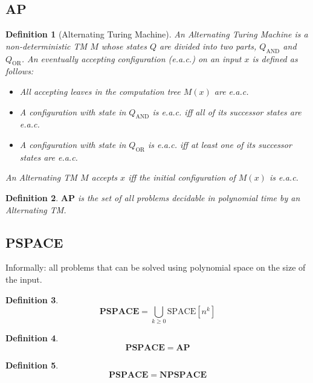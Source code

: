 \documentclass[]{article}
\theoremstyle{break}
\theoremstyle{break}
\newtheorem{definition}{Definition}[section]
\begin{document}
\subsection{AP} \label{sec:AP}

\begin{definition}[Alternating Turing Machine]
	An Alternating Turing Machine is a non-deterministic TM $M$ whose states $Q$ are divided into two parts, $Q_{\text{AND}}$ and $Q_{\text{OR}}$. An eventually accepting configuration (e.a.c.) on an input $x$ is defined as follows:
	
	\begin{itemize}
		\item All accepting leaves in the computation tree $M(x)$ are e.a.c.
		\item A configuration with state in $Q_{\text{AND}}$ is e.a.c. iff all of its successor states are e.a.c.
		\item A configuration with state in $Q_{\text{OR}}$ is e.a.c. iff at least one of its successor states are e.a.c.
	\end{itemize}
	
	An Alternating TM $M$ accepts $x$ iff the initial configuration of $M(x)$ is e.a.c.
\end{definition}

\begin{definition}
	$\mathbf{AP}$ is the set of all problems decidable in polynomial time by an Alternating TM.
\end{definition}

\subsection{PSPACE} \label{sec:PSPACE}

Informally: all problems that can be solved using polynomial space on the size of the input.

\begin{definition}
	$$\mathbf{PSPACE} = \bigcup_{k \geq 0} \hyperref[sec:SPACE]{\text{SPACE}[n^k]}$$
\end{definition}

\begin{definition}
	$$\mathbf{PSPACE} = \hyperref[sec:AP]{\mathbf{AP}}$$
\end{definition}

\begin{definition}
	$$\mathbf{PSPACE} = \hyperref[sec:NPSPACE]{\mathbf{NPSPACE}}$$
\end{definition}
\end{document}
